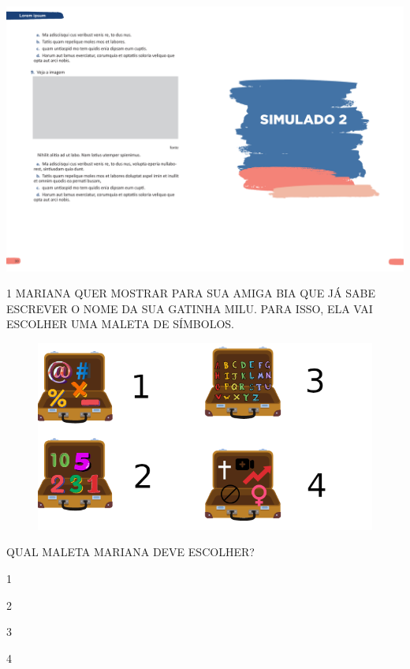 \pagebreak
\vspace*{-4.2cm}
\hspace*{-4cm}\includegraphics[scale=1]{../watermarks/2simulado5ano.pdf}



\pagebreak

\num{1} MARIANA QUER MOSTRAR PARA SUA AMIGA BIA QUE JÁ SABE ESCREVER O NOME DA SUA GATINHA MILU. PARA ISSO, ELA VAI ESCOLHER UMA MALETA DE SÍMBOLOS. 

\begin{figure}[htpb!]
\includegraphics[width=\textwidth]{media/image209.png}
\end{figure}

QUAL MALETA MARIANA DEVE ESCOLHER?

\begin{escolha}
\item 1

\item 2

\item 3

\item 4
\end{escolha}

